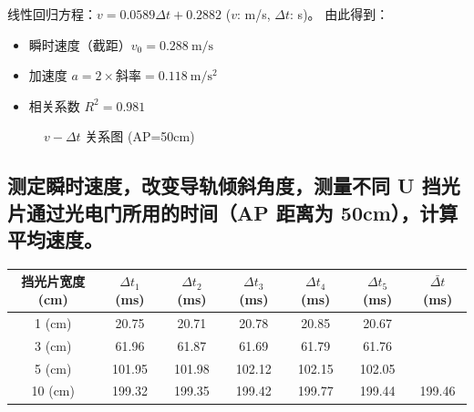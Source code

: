 \documentclass[11pt]{article}
\begin{document}
线性回归方程：$v = 0.0589 \Delta t + 0.2882$ ($v$: m/s, $\Delta t$: s)。
由此得到：
\begin{itemize}
    \item 瞬时速度（截距）$v_0 = 0.288\ \mathrm{m/s}$
    \item 加速度 $a = 2 \times \text{斜率} = 0.118\ \mathrm{m/s^2}$
    \item 相关系数 $R^2 = 0.981$
\end{itemize}

\begin{figure}[H]
    \centering
    \caption{$v-\Delta t$ 关系图 (AP=50cm)}
\end{figure}

\subsection{测定瞬时速度，改变导轨倾斜角度，测量不同 U 挡光片通过光电门所用的时间（AP 距离为 50cm），计算平均速度。}

\begin{table}[h]
    \centering
    \begin{tabular}{ccccccc}
        \toprule
        挡光片宽度 (cm) & $\Delta t_1$ (ms) & $\Delta t_2$ (ms) & $\Delta t_3$ (ms) & $\Delta t_4$ (ms) & $\Delta t_5$ (ms) & $\bar{\Delta t}$ (ms) \\
        \midrule
        1 (cm)  & 20.75  & 20.71  & 20.78  & 20.85  & 20.67  & \\
        3 (cm)  & 61.96  & 61.87  & 61.69  & 61.79  & 61.76  & \\
        5 (cm)  & 101.95 & 101.98 & 102.12 & 102.15 & 102.05 & \\
        10 (cm) & 199.32 & 199.35 & 199.42 & 199.77 & 199.44 & 199.46 \\
        \bottomrule
    \end{tabular}
\end{table}
\end{document}
